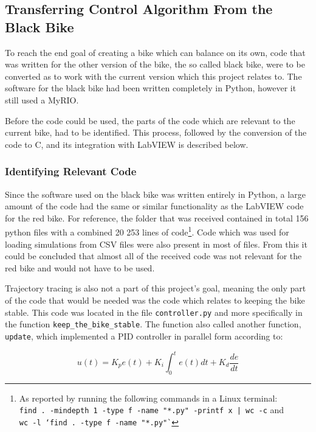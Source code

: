 \subsection{Transferring Control Algorithm From the Black Bike}

To reach the end goal of creating a bike which can balance on its own, code that was written for the other version of the bike, the so called black bike, were to be converted as to work with the current version which this project relates to. The software for the black bike had been written completely in Python, however it still used a MyRIO. 

Before the code could be used, the parts of the code which are relevant to the current bike, had to be identified. This process, followed by the conversion of the code to C, and its integration with LabVIEW is described below.

\subsubsection{Identifying Relevant Code}

Since the software used on the black bike was written entirely in Python, a large amount of the code had the same or similar functionality as the LabVIEW code for the red bike. For reference, the folder that was received contained in total 156 python files with a combined 20 253 lines of code\footnote{As reported by running the following commands in a Linux terminal:\\\texttt{find . -mindepth 1 -type f -name "*.py" -printf x | wc -c} and\\\texttt{wc -l `find . -type f -name "*.py"`}}. Code which was used for loading simulations from CSV files were also present in most of files. From this it could be concluded that almost all of the received code was not relevant for the red bike and would not have to be used.

Trajectory tracing is also not a part of this project's goal, meaning the only part of the code that would be needed was the code which relates to keeping the bike stable. This code was located in the file \texttt{controller.py} and more specifically in the function \texttt{keep\_the\_bike\_stable}. The function also called another function, \texttt{update}, which implemented a PID controller in parallel form according to:

\begin{equation*}
    u(t) = K_p e(t) + K_i \int_{0}^{t} e(t)dt + K_d \frac{de}{dt}
\end{equation*}

